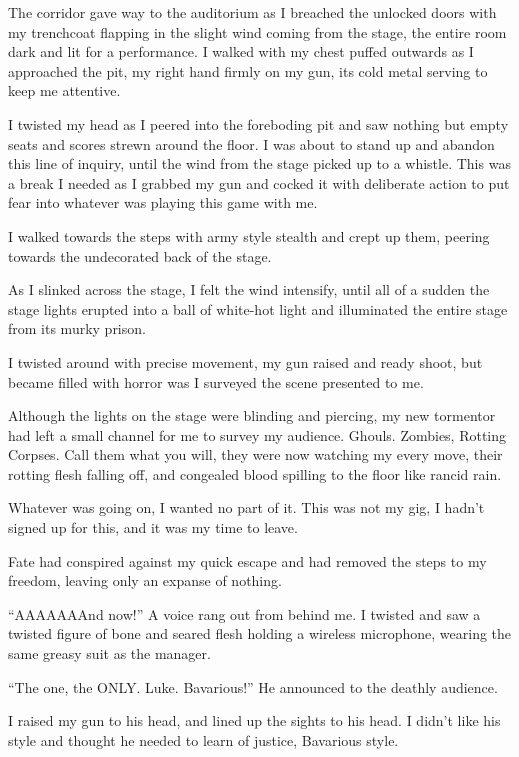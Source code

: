 The corridor gave way to the auditorium as I breached the unlocked
doors with my trenchcoat flapping in the slight wind coming from
the stage, the entire room dark and lit for a performance. I walked
with my chest puffed outwards as I approached the pit, my right
hand firmly on my gun, its cold metal serving to keep me
attentive.

I twisted my head as I peered into the foreboding pit and saw
nothing but empty seats and scores strewn around the floor. I was
about to stand up and abandon this line of inquiry, until the wind
from the stage picked up to a whistle. This was a break I needed as
I grabbed my gun and cocked it with deliberate action to put fear
into whatever was playing this game with me.

I walked towards the steps with army style stealth and crept up
them, peering towards the undecorated back of the stage.

As I slinked across the stage, I felt the wind intensify, until all
of a sudden the stage lights erupted into a ball of white-hot light
and illuminated the entire stage from its murky prison.

I twisted around with precise movement, my gun raised and ready
shoot, but became filled with horror was I surveyed the scene
presented to me.



Although the lights on the stage were blinding and piercing, my new
tormentor had left a small channel for me to survey my audience.
Ghouls. Zombies, Rotting Corpses. Call them what you will, they
were now watching my every move, their rotting flesh falling off,
and congealed blood spilling to the floor like rancid rain.

Whatever was going on, I wanted no part of it. This was not my gig,
I hadn't signed up for this, and it was my time to
leave.

Fate had conspired against my quick escape and had removed the
steps to my freedom, leaving only an expanse of nothing.



``AAAAAAAnd now!'' A voice rang out from behind me. I
twisted and saw a twisted figure of bone and seared flesh holding a
wireless microphone, wearing the same greasy suit as the
manager.

``The one, the ONLY. Luke. Bavarious!'' He announced to
the deathly audience.

I raised my gun to his head, and lined up the sights to his head. I
didn't like his style and thought he needed to learn of
justice, Bavarious style.



